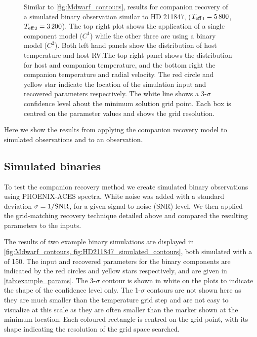 \begin{figure*}
    \centering
    \caption{Similar to \cref{fig:Mdwarf_contours}, \textchisquared{} results for companion recovery of a simulated binary observation similar to {HD 211847}, (\({T_{\mathrm{eff}}}_{1} = 5\,800\)\K{}, \({T_{\mathrm{eff}}}_{2}=3\,200\)\K{}).
The top right plot shows the application of a single component model (\(C^1\)) while the other three are using a binary model (\(C^2\)).
Both left hand panels show the distribution of host temperature and host {RV}.\@ The top right panel shows the distribution for host and companion temperature, and the bottom right the companion temperature and radial velocity.
        The red circle and yellow star indicate the location of the simulation input and recovered parameters respectively.
        The white line shows a 3-\(\sigma\) confidence level about the minimum \textchisquared{} solution grid point.
Each box is centred on the parameter values and shows the grid resolution.}
    \label{fig:HD211847_simulated_contours}
\end{figure*}
Here we show the results from applying the companion recovery model to simulated observations and to an observation.


\subsection{Simulated binaries}
\label{subsec:simulated_binaries}
To test the companion recovery method we create simulated binary observations using {PHOENIX-ACES} spectra.
White noise was added with a standard deviation \(\rm \sigma = 1/{SNR}\), for a given signal-to-noise ({SNR}) level.
We then applied the grid-matching recovery technique detailed above and compared the resulting parameters to the inputs.

The results of two example binary simulations are displayed in \cref{fig:Mdwarf_contours, fig:HD211847_simulated_contours}, both simulated with a \snr{} of 150.
The input and recovered parameters for the binary components are indicated by the red circles and yellow stars respectively, and are given in \cref{tab:example_params}.
The 3-\(\sigma\) contour is shown in white on the plots to indicate the shape of the confidence level only.
The 1-\(\sigma\) contours are not shown here as they are much smaller than the temperature grid step and are not easy to visualize at this scale as they are often smaller than the marker shown at the minimum location.
Each coloured rectangle is centred on the grid point, with its shape indicating the resolution of the grid space searched.

